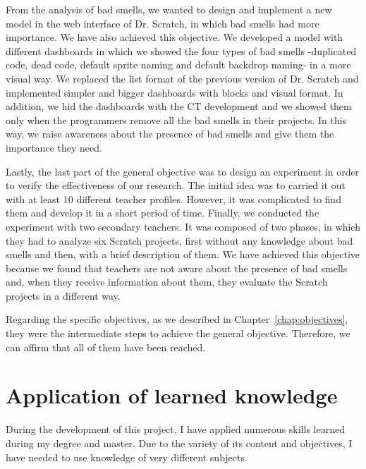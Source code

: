 From the analysis of bad smells, we wanted to design and implement a new model in the web interface of Dr. Scratch, in which bad smells had more importance. We have also achieved this objective. We developed a model with different dashboards in which we showed the four types of bad smells -duplicated code, dead code, default sprite naming and default backdrop naming- in a more visual way. We replaced the list format of the previous version of Dr. Scratch and implemented simpler and bigger dashboards with blocks and visual format. In addition, we hid the dashboards with the CT development and we showed them only when the programmers remove all the bad smells in their projects. In this way, we raise awareness about the presence of bad smells and give them the importance they need. 

Lastly, the last part of the general objective was to design an experiment in order to verify the effectiveness of our research. The initial idea was to carried it out with at least 10 different teacher profiles. However, it was complicated to find them and develop it in a short period of time. Finally, we conducted the experiment with two secondary teachers. It was composed of two phases, in which they had to analyze six Scratch projects, first without any knowledge about bad smells and then, with a brief description of them. We have achieved this objective because we found that teachers are not aware about the presence of bad smells and, when they receive information about them, they evaluate the Scratch projects in a different way.

Regarding the specific objectives, as we described in Chapter~\ref{chap:objectives}, they were the intermediate steps to achieve the general objective. Therefore, we can affirm that all of them have been reached. 


\section{Application of learned knowledge}
\label{sec:applicacion_knowledge}

During the development of this project, I have applied numerous skills learned during my degree and master. Due to the variety of its content and objectives, I have needed to use knowledge of very different subjects.

